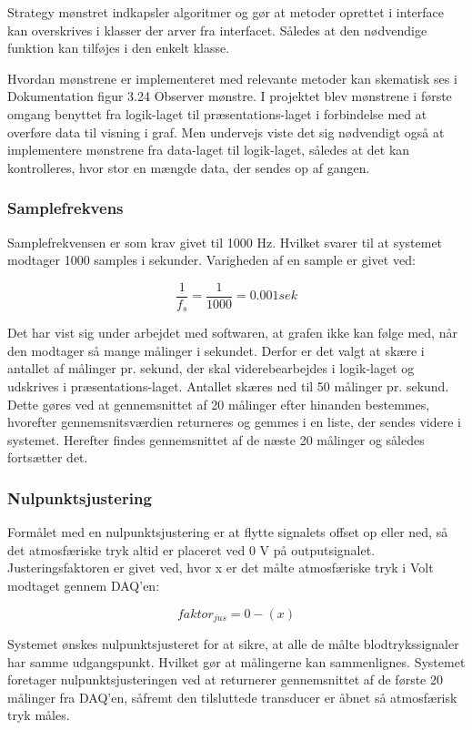 Strategy mønstret indkapsler algoritmer og gør at metoder oprettet i interface kan overskrives i klasser der arver fra interfacet. Således at den nødvendige funktion kan tilføjes i den enkelt klasse.

Hvordan mønstrene er implementeret med relevante metoder kan skematisk ses i Dokumentation figur 3.24 Observer mønstre. I projektet blev mønstrene i første omgang benyttet fra logik-laget til præsentations-laget i forbindelse med at overføre data til visning i graf. Men undervejs viste det sig nødvendigt også at implementere mønstrene fra data-laget til logik-laget, således at det kan kontrolleres, hvor stor en mængde data, der sendes op af gangen. 

\subsubsection{Samplefrekvens}
Samplefrekvensen er som krav givet til 1000 Hz. Hvilket svarer til at systemet modtager 1000 samples i sekunder. Varigheden af en sample er givet ved: 
\begin{ceqn}
\begin{equation}
\frac{1}{f_s}=\frac{1}{1000}=0.001 sek
\end{equation}
\end{ceqn}
Det har vist sig under arbejdet med softwaren, at grafen ikke kan følge med, når den modtager så mange målinger i sekundet. Derfor er det valgt at skære i antallet af målinger pr. sekund, der skal viderebearbejdes i logik-laget og udskrives i præsentations-laget. Antallet skæres ned til 50 målinger pr. sekund. Dette gøres ved at gennemsnittet af 20 målinger efter hinanden bestemmes, hvorefter gennemsnitsværdien returneres og gemmes i en liste, der sendes videre i systemet. Herefter findes gennemsnittet af de næste 20 målinger og således fortsætter det. 

\subsubsection{Nulpunktsjustering}
Formålet med en nulpunktsjustering er at flytte signalets offset op eller ned, så det atmosfæriske tryk altid er placeret ved 0 V på outputsignalet. Justeringsfaktoren er givet ved, hvor x er det målte atmosfæriske tryk i Volt modtaget gennem DAQ'en:
\begin{ceqn}
\begin{equation}
faktor_{jus}=0-(x)
\end{equation}
\end{ceqn}
Systemet ønskes nulpunktsjusteret for at sikre, at alle de målte blodtrykssignaler har samme udgangspunkt. Hvilket gør at målingerne kan sammenlignes. Systemet foretager nulpunktsjusteringen ved at returnerer gennemsnittet af de første 20 målinger fra DAQ'en, såfremt den tilsluttede transducer er åbnet så atmosfærisk tryk måles.  

